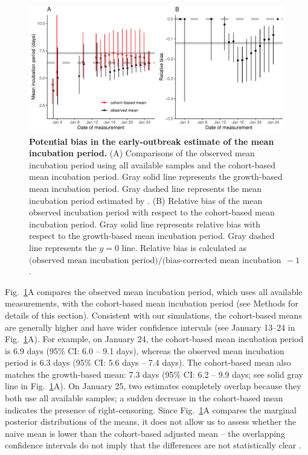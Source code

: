 \documentclass[12pt]{article}
\newcommand{\fref}[1]{Fig.~\ref{fig:#1}}
\begin{document}
\begin{figure}[!th]
\includegraphics[width=\textwidth]{figure_baker.pdf}
\caption{
\textbf{Potential bias in the early-outbreak estimate of the mean incubation period.}
(A) Comparisons of the observed mean incubation period using all available samples and the cohort-based mean incubation period.
Gray solid line represents the growth-based mean incubation period.
Gray dashed line represents the mean incubation period estimated by \cite{backer2020incubation}.
(B) Relative bias of the mean observed incubation period with respect to the cohort-based mean incubation period.
Gray solid line represents relative bias with respect to the growth-based mean incubation period.
Gray dashed line represents the $y=0$ line.
Relative bias is calculated as $\textrm{(observed mean incubation period)/(bias-corrected mean incubation period)} - 1$.
}
\label{fig:baker}
\end{figure}

\fref{baker}A compares the observed mean incubation period, which uses all available measurements, with the cohort-based mean incubation period (see Methods for details of this section).
Consistent with our simulations, the cohort-based means are generally higher and have wider confidence intervals (see January 13--24 in \fref{baker}A).
For example, on January 24, the cohort-based mean incubation period is 6.9 days (95\% CI: 6.0 -- 9.1 days), whereas the observed mean incubation period is 6.3 days (95\% CI: 5.6 days -- 7.4 days).
The cohort-based mean also matches the growth-based mean: 7.3 days (95\% CI: 6.2 -- 9.9 days; see solid gray line in \fref{baker}A).
On January 25, two estimates completely overlap because they both use all available samples; a sudden decrease in the cohort-based mean indicates the presence of right-censoring.
Since \fref{baker}A compares the marginal posterior distributions of the means, it does not allow us to assess whether the naive mean is lower than the cohort-based adjusted mean -- the overlapping confidence intervals do not imply that the differences are not statistically clear \citep{dushoff2019can}.
\end{document}
